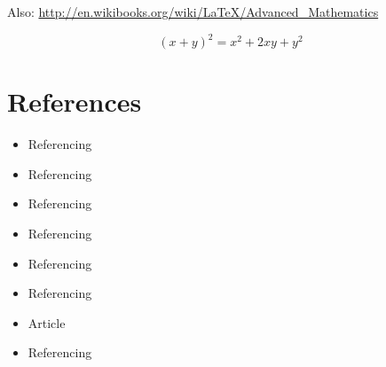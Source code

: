 Also: \url{http://en.wikibooks.org/wiki/LaTeX/Advanced_Mathematics}

\begin{equation}
  (x + y)^2 = x^2 + 2xy + y^2
  \label{eq:LABEL_EQ_1}
\end{equation}

\section{References}\label{sec:LABEL_CHP_2_SEC_D}
\begin{itemize}
  \item Referencing 
  \item Referencing 
  \item Referencing 
  \item Referencing 
  \item Referencing 
  \item Referencing 
  \item Article \cite{art:REF_ART_1}
  \item Referencing 
\end{itemize}